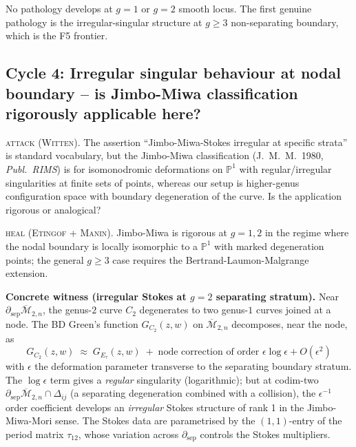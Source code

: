 \documentclass[12pt]{article}
\providecommand{\Mbar}{\overline{\mathcal{M}}}
\theoremstyle{definition}
\begin{document}
No pathology develops at $g = 1$ or $g = 2$ smooth locus.
The first genuine pathology is the irregular-singular
structure at $g \geq 3$ non-separating boundary, which is
the F5 frontier.

\subsection{Cycle 4: Irregular singular behaviour at nodal
boundary -- is Jimbo-Miwa classification rigorously
applicable here?}
\label{ssec:cycle-4}

\textsc{attack (Witten).}
The assertion ``Jimbo-Miwa-Stokes irregular at specific
strata'' is standard vocabulary, but the Jimbo-Miwa
classification (J.\ M.\ M.\ 1980, \emph{Publ.\ RIMS})
is for isomonodromic deformations on $\mathbb{P}^1$ with
regular/irregular singularities at finite sets of points,
whereas our setup is higher-genus configuration space with
boundary degeneration of the curve.  Is the application
rigorous or analogical?

\textsc{heal (Etingof + Manin).}
Jimbo-Miwa is rigorous at $g = 1, 2$ in the regime where the
nodal boundary is locally isomorphic to a $\mathbb{P}^1$ with
marked degeneration points; the general $g \geq 3$ case
requires the Bertrand-Laumon-Malgrange extension.

\textbf{Concrete witness (irregular Stokes at $g = 2$
separating stratum).}
Near $\partial_{\mathrm{sep}}\Mbar_{2,n}$, the genus-$2$ curve
$C_{2}$ degenerates to two genus-$1$ curves joined at a node.
The BD Green's function $G_{C_2}(z, w)$ on $\Mbar_{2,n}$
decomposes, near the node, as
\[
   G_{C_2}(z, w)
   \;\approx\;
   G_{E_\tau}(z, w)
   \;+\; \text{node correction of order }\epsilon\log\epsilon + O(\epsilon^2)
\]
with $\epsilon$ the deformation parameter transverse to the
separating boundary stratum.  The $\log\epsilon$ term gives a
\emph{regular} singularity (logarithmic); but at codim-two
$\partial_{\mathrm{sep}}\Mbar_{2,n} \cap \Delta_{ij}$ (a
separating degeneration combined with a collision), the
$\epsilon^{-1}$ order coefficient develops an
\emph{irregular} Stokes structure of rank 1 in the
Jimbo-Miwa-Mori sense.
The Stokes data are parametrised by the $(1,1)$-entry of the
period matrix $\tau_{12}$, whose variation across
$\partial_{\mathrm{sep}}$ controls the Stokes multipliers.
\end{document}
